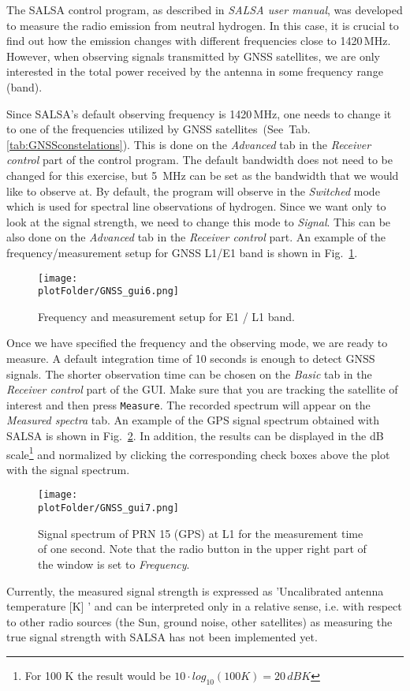 The SALSA control program, as described in \emph{SALSA user manual}, was
developed to measure the radio emission from neutral hydrogen. In this case, it is crucial 
to find out how the emission changes with different frequencies close to 1420\,MHz. However, 
when observing signals transmitted by GNSS satellites, we are only interested in the total power 
received by the antenna in some frequency range (band). \par{}
Since SALSA's default observing frequency is 1420\,MHz, one needs to change it 
to one of the frequencies utilized by GNSS satellites~(See~Tab.\ref{tab:GNSSconstelations}). 
This is done on the \emph{Advanced} tab in the \emph{Receiver control} 
part of the control program. The default bandwidth does not need to be changed for this exercise, 
but 5~MHz can be set as the bandwidth that we would like to observe at. By default, the program 
will observe in the \emph{Switched} mode which is used for spectral line observations of hydrogen. 
Since we want only to look at the signal strength, we need to change this mode to
\emph{Signal}. This can be also done on the \emph{Advanced} tab in the \emph{Receiver control}
part. An example of the frequency/measurement setup for GNSS L1/E1 band is shown in Fig.~\ref{MainLab:fig:FrequencySetup}.\par{}
\begin{figure}[ht] 
\centering
        \texttt{[image: \\plotFolder/GNSS\_gui6.png]}
        \caption{Frequency and measurement setup for E1 / L1 band.}
\label{MainLab:fig:FrequencySetup}            
\end{figure} 
Once we have specified the frequency and the observing mode, we are ready to
measure. A default integration time of 10 seconds is enough to detect GNSS signals. 
The shorter observation time can be chosen on the \emph{Basic} tab in the \emph{Receiver control} 
part of the GUI. Make sure that you are tracking the satellite of interest and then press \verb!Measure!. 
The recorded spectrum will appear on the \emph{Measured spectra} tab. An example of the 
GPS signal spectrum obtained with SALSA is shown in Fig.~\ref{MainLab:fig:Spectrum}. 
In addition, the results can be displayed in the dB scale\footnote{For 100 K the result would be $10\cdot log_{10}(100K) = 20\,dBK$} 
and normalized by clicking the corresponding check boxes above the plot with the signal spectrum. \par{}

\begin{figure}[ht] 
\centering
        \texttt{[image: \\plotFolder/GNSS\_gui7.png]}
        \caption{Signal spectrum of PRN 15 (GPS) at L1 for the measurement time of one second. Note that the radio button in the upper right part of the
        window is set to \emph{Frequency}. }
\label{MainLab:fig:Spectrum}            
\end{figure} 
Currently, the measured signal strength is expressed as 'Uncalibrated antenna temperature [K] ' and can be interpreted only in a relative
sense, i.e. with respect to other radio sources (the Sun, ground noise, other satellites) as measuring the true signal strength with 
SALSA has not been implemented yet. \par{}

